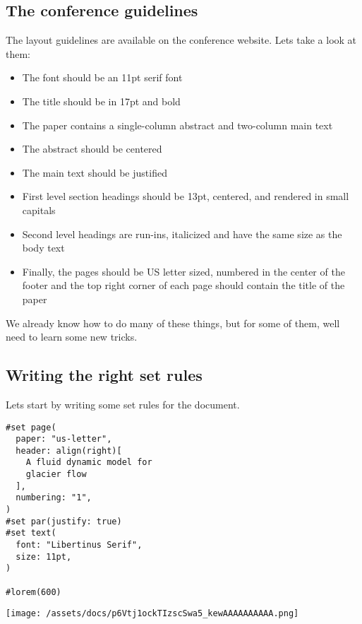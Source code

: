 \subsection{The conference guidelines}\label{guidelines}

The layout guidelines are available on the conference website.
Let\textquotesingle s take a look at them:

\begin{itemize}
\tightlist
\item
  The font should be an 11pt serif font
\item
  The title should be in 17pt and bold
\item
  The paper contains a single-column abstract and two-column main text
\item
  The abstract should be centered
\item
  The main text should be justified
\item
  First level section headings should be 13pt, centered, and rendered in
  small capitals
\item
  Second level headings are run-ins, italicized and have the same size
  as the body text
\item
  Finally, the pages should be US letter sized, numbered in the center
  of the footer and the top right corner of each page should contain the
  title of the paper
\end{itemize}

We already know how to do many of these things, but for some of them,
we\textquotesingle ll need to learn some new tricks.

\subsection{Writing the right set rules}\label{set-rules}

Let\textquotesingle s start by writing some set rules for the document.

\begin{verbatim}
#set page(
  paper: "us-letter",
  header: align(right)[
    A fluid dynamic model for
    glacier flow
  ],
  numbering: "1",
)
#set par(justify: true)
#set text(
  font: "Libertinus Serif",
  size: 11pt,
)

#lorem(600)
\end{verbatim}

\texttt{[image: /assets/docs/p6Vtj1ockTIzscSwa5\_kewAAAAAAAAAA.png]}

